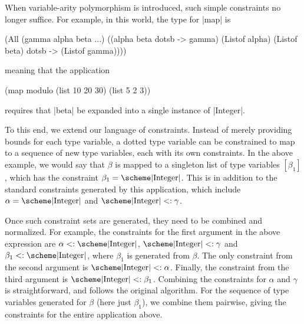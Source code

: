 \begin{schemeregion}
\newcommand{\integer}{\hbox{\scheme|Integer|}}
\newcommand{\boolean}{\hbox{\scheme|Boolean|}}

When variable-arity polymorphism is introduced, such simple
constraints no longer suffice.  For example, in this world,  the type for
\scheme|map| is
\begin{schemedisplay}
(All (gamma alpha beta ...)
  ((alpha beta dotsb -> gamma) (Listof alpha) (Listof beta) dotsb -> (Listof gamma))))
\end{schemedisplay}
meaning that the application 
\begin{schemedisplay}
(map modulo (list 10 20 30) (list 5 2 3))  
\end{schemedisplay}
 requires that \scheme|beta| be expanded into a single instance of
\scheme|Integer|.  

To this end, we extend our
language of constraints.  Instead of merely providing bounds for each
type variable, a dotted type variable can be constrained to map to a
sequence of new type variables, each with its own constraints.  In
the above example, we would say that $\beta$ is mapped to a singleton
list of type variables $[\beta_1]$, which has the constraint $\beta_1 =
\hbox{\scheme|Integer|}$. This is in addition to the standard
constraints generated by this application, which include $\alpha =
\hbox{\scheme|Integer|}$ and $\integer <: \gamma$.

Once such constraint sets are generated, they need to be combined and normalized.
For example, the constraints for the first argument in the above
expression are $\alpha <: \integer$, $\integer <: \gamma$ and $\beta_1
<: \integer$, where $\beta_1$ is generated from $\beta$. The only
constraint from the second argument is $\integer <: \alpha$.  Finally,
the constraint from the third argument is $\integer <: \beta_1$.
Combining the constraints for $\alpha$ and $\gamma$ is
straightforward, and follows the original algorithm.  For the sequence
of type variables generated for $\beta$ (here just $\beta_1$), we
combine them pairwise, giving the constraints for the entire
application above.


\end{schemeregion}
